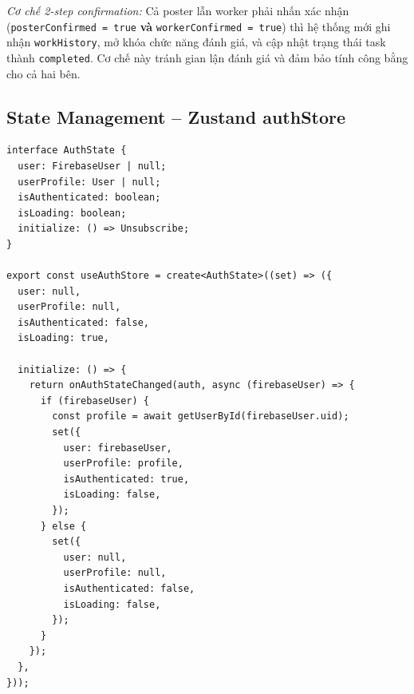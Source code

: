 \textit{Cơ chế 2-step confirmation:} Cả poster lẫn worker phải nhấn xác nhận
(\texttt{posterConfirmed = true} \textbf{và} \texttt{workerConfirmed = true}) thì hệ
thống mới ghi nhận \texttt{workHistory}, mở khóa chức năng đánh giá, và cập nhật
trạng thái task thành \texttt{completed}. Cơ chế này tránh gian lận đánh giá
và đảm bảo tính công bằng cho cả hai bên.

\subsection{State Management -- Zustand authStore}

\begin{lstlisting}[caption={authStore.ts -- Global auth state with Zustand}]
interface AuthState {
  user: FirebaseUser | null;
  userProfile: User | null;
  isAuthenticated: boolean;
  isLoading: boolean;
  initialize: () => Unsubscribe;
}

export const useAuthStore = create<AuthState>((set) => ({
  user: null,
  userProfile: null,
  isAuthenticated: false,
  isLoading: true,

  initialize: () => {
    return onAuthStateChanged(auth, async (firebaseUser) => {
      if (firebaseUser) {
        const profile = await getUserById(firebaseUser.uid);
        set({
          user: firebaseUser,
          userProfile: profile,
          isAuthenticated: true,
          isLoading: false,
        });
      } else {
        set({
          user: null,
          userProfile: null,
          isAuthenticated: false,
          isLoading: false,
        });
      }
    });
  },
}));
\end{lstlisting}

